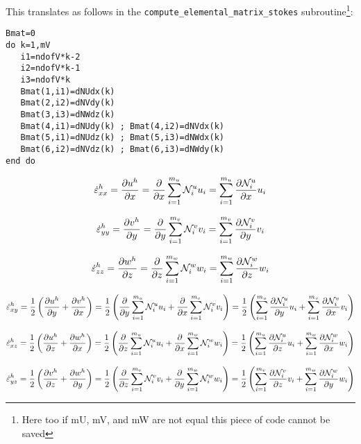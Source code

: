 \documentclass[a4paper,12pt]{article}
\begin{document}
This translates as follows in the {\tt compute\_elemental\_matrix\_stokes} subroutine\footnote{Here
too if mU, mV, and mW are not equal this piece of code cannot be saved}:

\begin{lstlisting}
Bmat=0
do k=1,mV    
   i1=ndofV*k-2    
   i2=ndofV*k-1    
   i3=ndofV*k    
   Bmat(1,i1)=dNUdx(k)
   Bmat(2,i2)=dNVdy(k)
   Bmat(3,i3)=dNWdz(k)
   Bmat(4,i1)=dNUdy(k) ; Bmat(4,i2)=dNVdx(k)
   Bmat(5,i1)=dNUdz(k) ; Bmat(5,i3)=dNWdx(k)
   Bmat(6,i2)=dNVdz(k) ; Bmat(6,i3)=dNWdy(k)
end do 
\end{lstlisting}



\[
\dot{\varepsilon}_{xx}^h 
= \frac{\partial u^h}{\partial x}
= \frac{\partial }{\partial x} \sum_{i=1}^{m_u} {\mathcal{N}}_i^u u_i
= \sum_{i=1}^{m_u} \frac{\partial {\mathcal{N}}_i^u }{\partial x} u_i
\]

\[
\dot{\varepsilon}_{yy}^h 
= \frac{\partial v^h}{\partial y}
= \frac{\partial }{\partial y} \sum_{i=1}^{m_v} {\mathcal{N}}_i^v v_i
= \sum_{i=1}^{m_v} \frac{\partial {\mathcal{N}}_i^v }{\partial y} v_i
\]

\[
\dot{\varepsilon}_{zz}^h 
= \frac{\partial w^h}{\partial z}
= \frac{\partial }{\partial z} \sum_{i=1}^{m_w} {\mathcal{N}}_i^w w_i
= \sum_{i=1}^{m_w} \frac{\partial {\mathcal{N}}_i^w }{\partial z} w_i
\]



\[
\dot{\varepsilon}_{xy}^h 
= \frac12 \left( \frac{\partial u^h}{\partial y}
+ \frac{\partial v^h}{\partial x} \right)
= \frac12 \left(
\frac{\partial }{\partial y} \sum_{i=1}^{m_u} {\mathcal{N}}_i^u u_i
+
\frac{\partial }{\partial x} \sum_{i=1}^{m_v} {\mathcal{N}}_i^v v_i
\right)
= \frac12 \left(
\sum_{i=1}^{m_u} \frac{\partial {\mathcal{N}}_i^u}{\partial y} u_i
+
\sum_{i=1}^{m_v} \frac{\partial {\mathcal{N}}_i^v}{\partial x} v_i
\right)
\]

\[
\dot{\varepsilon}_{xz}^h 
= \frac12 \left( \frac{\partial u^h}{\partial z}
+ \frac{\partial w^h}{\partial x} \right)
= \frac12 \left(
\frac{\partial }{\partial z} \sum_{i=1}^{m_u} {\mathcal{N}}_i^u u_i
+
\frac{\partial }{\partial x} \sum_{i=1}^{m_w} {\mathcal{N}}_i^w w_i
\right)
= \frac12 \left(
\sum_{i=1}^{m_u} \frac{\partial {\mathcal{N}}_i^u}{\partial z} u_i
+
\sum_{i=1}^{m_w} \frac{\partial {\mathcal{N}}_i^w}{\partial x} w_i
\right)
\]

\[
\dot{\varepsilon}_{yz}^h 
= \frac12 \left( \frac{\partial v^h}{\partial z}
+ \frac{\partial w^h}{\partial y} \right)
= \frac12 \left(
\frac{\partial }{\partial z} \sum_{i=1}^{m_v} {\mathcal{N}}_i^v v_i
+
\frac{\partial }{\partial y} \sum_{i=1}^{m_w} {\mathcal{N}}_i^w w_i
\right)
= \frac12 \left(
\sum_{i=1}^{m_v} \frac{\partial {\mathcal{N}}_i^v}{\partial z} v_i
+
\sum_{i=1}^{m_w} \frac{\partial {\mathcal{N}}_i^w}{\partial y} w_i
\right)
\]
\end{document}
